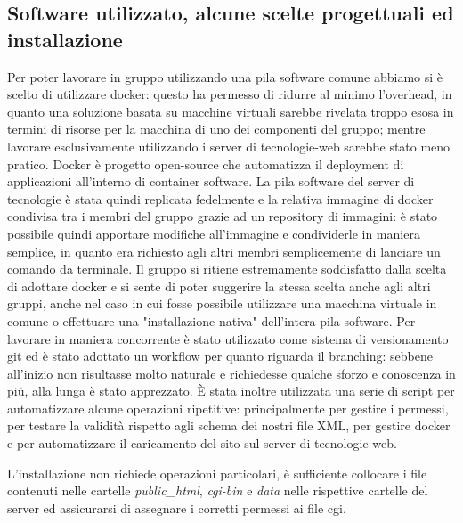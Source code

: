 \subsection{Software utilizzato, alcune scelte progettuali ed installazione}
Per poter lavorare in gruppo utilizzando una pila software comune abbiamo si è scelto di utilizzare docker: questo ha permesso di ridurre al minimo l'overhead, in quanto una soluzione basata su macchine virtuali sarebbe rivelata troppo esosa in termini di risorse per la macchina di uno dei componenti del gruppo; mentre lavorare esclusivamente utilizzando i server di tecnologie-web sarebbe stato meno pratico.
Docker è progetto open-source che automatizza il deployment di applicazioni all'interno di container software.
La pila software del server di tecnologie è stata quindi replicata fedelmente e la relativa immagine di docker condivisa tra i membri del gruppo grazie ad un repository di immagini: è stato possibile quindi apportare modifiche all'immagine e condividerle in maniera semplice, in quanto era richiesto agli altri membri semplicemente di lanciare un comando da terminale.
Il gruppo si ritiene estremamente soddisfatto dalla scelta di adottare docker e si sente di poter suggerire la stessa scelta anche agli altri gruppi, anche nel caso in cui fosse possibile utilizzare una macchina virtuale in comune o effettuare una "installazione nativa" dell'intera pila software.
Per lavorare in maniera concorrente è stato utilizzato come sistema di versionamento git ed è stato adottato un workflow per quanto riguarda il branching: sebbene all'inizio non risultasse molto naturale e richiedesse qualche sforzo e conoscenza in più, alla lunga è stato apprezzato.
È stata inoltre utilizzata una serie di script per automatizzare alcune operazioni ripetitive: principalmente per gestire i permessi, per testare la validità rispetto agli schema dei nostri file XML, per gestire docker e per automatizzare il caricamento del sito sul server di tecnologie web.

L'installazione non richiede operazioni particolari, è sufficiente collocare i file contenuti nelle cartelle \textit{public\_html}, \textit{cgi-bin} e \textit{data} nelle rispettive cartelle del server ed assicurarsi di assegnare i corretti permessi ai file cgi.
